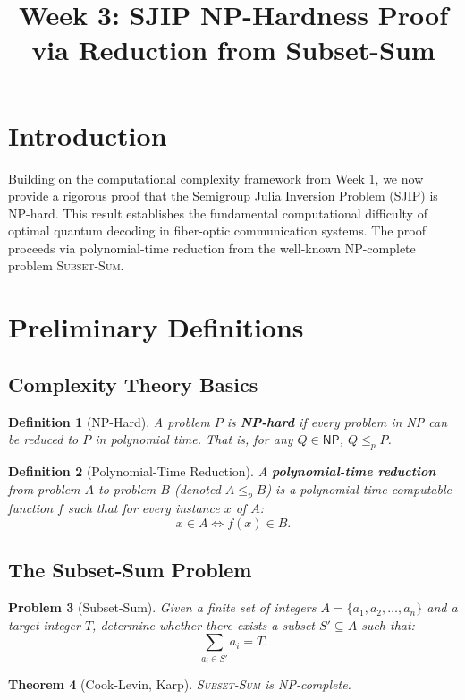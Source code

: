 \documentclass[11pt]{article}
\title{Week 3: SJIP NP-Hardness Proof via Reduction from Subset-Sum}
\author{}
\date{}
\newtheorem{theorem}{Theorem}[section]
\newtheorem{definition}[theorem]{Definition}
\newtheorem{problem}[theorem]{Problem}
\newcommand{\NP}{\textsf{NP}}
\begin{document}
\maketitle

\section{Introduction}
Building on the computational complexity framework from Week 1, we now provide a rigorous proof that the Semigroup Julia Inversion Problem (SJIP) is NP-hard. This result establishes the fundamental computational difficulty of optimal quantum decoding in fiber-optic communication systems. The proof proceeds via polynomial-time reduction from the well-known NP-complete problem \textsc{Subset-Sum}.

\section{Preliminary Definitions}

\subsection{Complexity Theory Basics}
\begin{definition}[NP-Hard]
A problem $P$ is \textbf{NP-hard} if every problem in NP can be reduced to $P$ in polynomial time. That is, for any $Q \in \NP$, $Q \leq_p P$.
\end{definition}

\begin{definition}[Polynomial-Time Reduction]
A \textbf{polynomial-time reduction} from problem $A$ to problem $B$ (denoted $A \leq_p B$) is a polynomial-time computable function $f$ such that for every instance $x$ of $A$:
\[
x \in A \iff f(x) \in B.
\]
\end{definition}

\subsection{The Subset-Sum Problem}
\begin{problem}[Subset-Sum]
\label{prob:subset-sum}
Given a finite set of integers $A = \{a_1, a_2, \dots, a_n\}$ and a target integer $T$, determine whether there exists a subset $S' \subseteq A$ such that:
\[
\sum_{a_i \in S'} a_i = T.
\]
\end{problem}

\begin{theorem}[Cook-Levin, Karp]
\textsc{Subset-Sum} is NP-complete.
\end{theorem}
\end{document}
